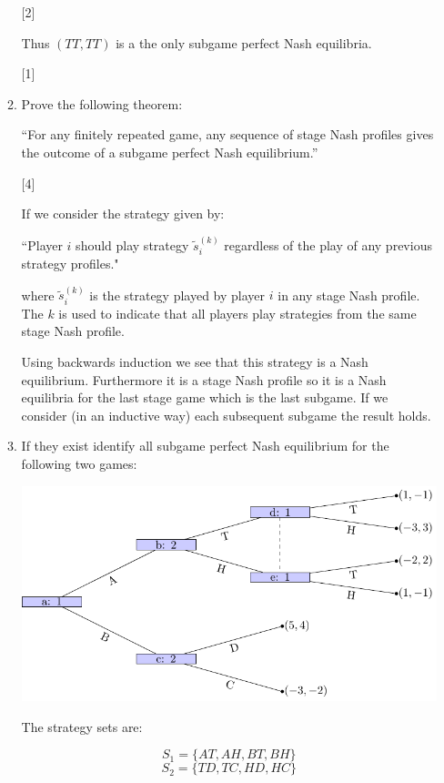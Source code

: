 \documentclass[12pt,a4paper]{article}
\begin{document}
\begin{enumerate}
\begin{enumerate}
            \hfill[2]

            Thus \((TT,TT)\) is a the only subgame perfect Nash equilibria.

            \hfill[1]


            \item Prove the following theorem:

            ``For any finitely repeated game, any sequence of stage Nash profiles gives the outcome of a subgame perfect Nash equilibrium.''

            \hfill[4]

            If we consider the strategy given by:

            ``Player $i$ should play strategy $\tilde s^{(k)}_i$ regardless of the play of any previous strategy profiles."

            where $\tilde s^{(k)}_i$ is the strategy played by player $i$ in any stage Nash profile. The $k$ is used to indicate that all players play strategies from the same stage Nash profile.

            Using backwards induction we see that this strategy is a Nash equilibrium. Furthermore it is a stage Nash profile so it is a Nash equilibria for the last stage game which is the last subgame. If we consider (in an inductive way) each subsequent subgame the result holds.

            \item If they exist identify all subgame perfect Nash equilibrium for the following two games:

                \begin{center}
                    \includegraphics[width=.8\textwidth]{images/mock-img02.pdf}\\
                \end{center}

                The strategy sets are:

                \[S_1=\{AT,AH,BT,BH\}\]
                \[S_2=\{TD,TC,HD,HC\}\]


\end{enumerate}
\end{enumerate}
\end{document}
